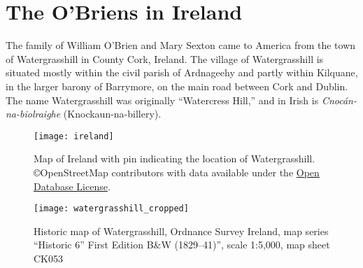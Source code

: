\chapter{The O'Briens in Ireland}

The family of William O'Brien and Mary Sexton came to America from the town of Watergrasshill in County Cork, Ireland.\citep{Edward2OBrienNaturalization,Michael2OBrienNaturalization,Margaret3DooleyBaptism} The village of Watergrasshill is situated mostly within the civil parish of Ardnageehy and partly within Kilquane, in the larger barony of Barrymore, on the main road between Cork and Dublin.\citep{TopographicalDictionary} The name Watergrasshill was originally ``Watercress Hill,'' and in Irish is \textit{Cnoc\'{a}n-na-biolraighe} (Knockaun-na-billery).\citep{LocalNames}

\begin{figure}
	\centering
	\texttt{[image: ireland]}
	\caption{Map of Ireland with pin indicating the location of Watergrasshill. \copyright OpenStreetMap contributors with data available under the \href{https://www.openstreetmap.org/copyright}{Open Database License}.}
\end{figure}

\begin{figure}
	\centering
	\texttt{[image: watergrasshill\_cropped]}
	\caption{Historic map of Watergrasshill, Ordnance Survey Ireland, map series ``Historic 6'' First Edition B\&W (1829--41)'', scale 1:5,000, map sheet CK053}
\end{figure}

